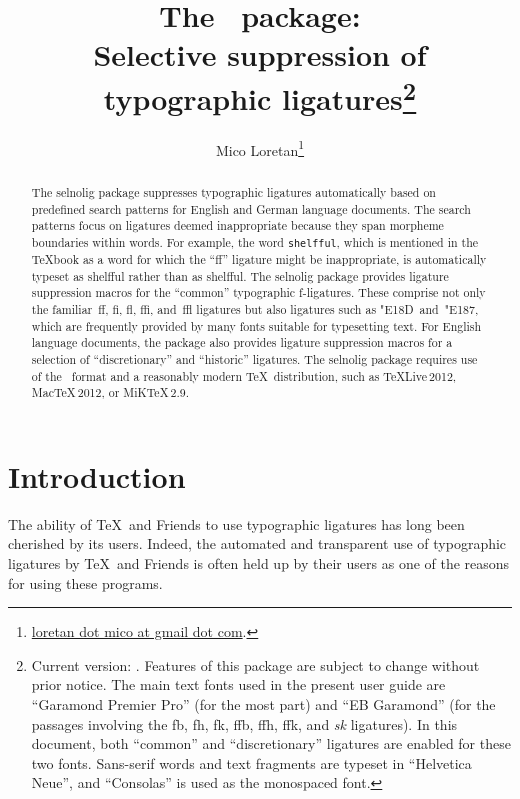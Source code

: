 \documentclass[12pt]{article}
\title{The \selnoligpackagename\ package: \\
Selective suppression of typographic ligatures\thanks{
Current version: \selnoligpackageversion. Features of this package are subject to change without prior notice. The main text fonts used in the present user guide are \enquote{Garamond Premier Pro} (for the most part) and \enquote{EB Garamond} (for the passages involving the \bgroup\ebg \mbox{fb}, \mbox{fh}, \mbox{fk}, \mbox{ffb}, \mbox{ffh},  \mbox{ffk}, and \emph{\mbox{sk}} ligatures\egroup). In this document, both \enquote{common} and \enquote{discretionary} ligatures are enabled for these two fonts. Sans-serif words and text fragments are typeset in \enquote{Helvetica Neue}, and \enquote{Consolas} is used as the monospaced font.}}
\author{Mico Loretan\thanks{
\href{mailto:loretan.mico@gmail.com}{loretan dot mico at gmail dot com}.}}
\date{\selnoligpackagedate}
\newcommand{\pkg}[1]{\textsf{#1}}
\newcommand{\opt}[1]{\texttt{#1}}
\begin{document}
\VerbatimFootnotes
{}

\maketitle


\begin{abstract}

The \pkg{selnolig} package suppresses typographic ligatures automatically based on pre\-defined search patterns for English and German language documents. The search patterns focus on ligatures deemed inappropriate because they span morpheme boundaries within words. For example, the word \opt{shelfful}, which is mentioned in the \TeX book as a word for which the \enquote{ff} ligature might be inappropriate, is automatically typeset as shelfful rather than as shel\mbox{ff}ul.
\newline\hspace*{\parindent}
The \pkg{selnolig} package provides ligature suppression macros  for the \enquote{common} typographic f-ligatures. These comprise not only the familiar~ff, fi, fl, ffi, and~ffl ligatures but also ligatures such as \char"E18D\ and~\char"E187, which are frequently provided by many fonts suitable for typesetting text.
\newline\hspace*{\parindent}
For English language documents, the package also provides ligature suppression macros for a selection of  \enquote{discretionary} and \enquote{historic} ligatures.
\newline\hspace*{\parindent}
The \pkg{selnolig} package requires use of the \LuaLaTeX\ format and a reasonably modern \TeX\ distribution, such as \TeX Live\,2012, Mac\TeX\,2012, or MiK\TeX\,2.9.
\end{abstract}


\enlargethispage{1\baselineskip}
\tableofcontents

\clearpage
{}
\section{Introduction}

The ability of \TeX\ and Friends to use typographic ligatures has long been cherished by its users. Indeed, the automated and transparent use of typographic ligatures by \TeX\ and Friends is often held up by their users as one of the reasons for using these programs.
\end{document}

